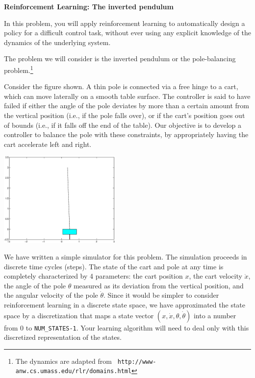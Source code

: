
\item {} {\bf Reinforcement Learning: The inverted pendulum}

In this problem, you will apply reinforcement learning to automatically
design a policy for a difficult control task, without ever using any 
explicit knowledge of the dynamics of the underlying system.

The problem we will consider is the inverted pendulum or the pole-balancing 
problem.\footnote{The dynamics are adapted from {\tt
    http://www-anw.cs.umass.edu/rlr/domains.html}}

Consider the figure shown. A thin pole is connected via a free hinge to a cart, 
which can move laterally on a smooth table surface. The controller is said to 
have failed if either the angle of the pole deviates by more than a certain
amount from the vertical position (i.e., if the pole falls over), or if the
cart's position goes out of bounds (i.e., if it falls off the end of the table).
Our objective is to develop a controller to balance the pole with these 
constraints, by appropriately having the cart accelerate left and right.


\begin{center}
  \includegraphics[width=6cm]{cartpole/cart_pole.eps}
\end{center}

We have written a simple simulator for this problem. The simulation 
proceeds in discrete time cycles (steps). The state of the cart and pole at any time 
is completely characterized by 4 parameters: the cart position $x$, the 
cart velocity $\dot{x}$, the angle of the pole $\theta$ measured as its deviation 
from the vertical position, and the angular velocity of the pole $\dot{\theta}$.  
Since it would be simpler to
consider reinforcement learning in a discrete state space,
we have approximated the state space by a discretization that maps 
a state vector $(x,\dot{x}, \theta, \dot{\theta})$ into a number
from 0 to {\tt NUM\_STATES-1}. Your learning algorithm will need to 
deal only with this discretized representation of the states.

